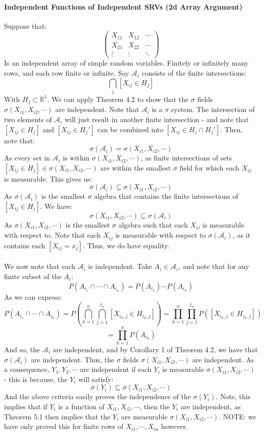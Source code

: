 \documentclass[12pt,a4paper]{article}
\newcommand{\1}[1]{\mathbbm{1}\left\{ #1 \right\}}
\newcommand{\R}{\mathbb{R}}
\newcommand{\acal}{\mathcal{A}}
\begin{document}
\paragraph{Independent Functions of Independent SRVs (2d Array Argument)} Suppose that:
$$
	\begin{pmatrix}
	X_{11} & X_{12} & \cdots\\
	X_{21} & X_{22} & \cdots\\
	\vdots & \vdots & \ddots
	\end{pmatrix}
$$
Is an independent array of simple random variables. Finitely or infinitely many rows, and each row finite or infinite. Say $\acal_i$ consists of the finite intersections:
$$
	\bigcap_j [X_{ij} \in H_j]
$$
With $H_j \subset \R^1$. We can apply Theorem 4.2 to show that the $\sigma$ fields $\sigma(X_{i1}, X_{i2}, \cdots)$ are independent. Note that $\acal_i$ is a $\pi$ system. The intersection of two elements of $\acal_i$ will just result in another finite intersection - and note that $[X_{ij} \in H_j]$ and $[X_{ij} \in H_j']$ can be combined into $[X_{ij} \in H_j \cap H_j']$. Then, note that:
$$
	\sigma(\acal_i) = \sigma(X_{i1}, X_{i2}, \cdots)
$$
As every set in $\acal_i$ is within $\sigma(X_{i1}, X_{i2}, \cdots)$, as finite intersections of sets $[X_{ij} \in H_j] \in \sigma(X_{i1}, X_{i2}, \cdots)$ are within the smallest $\sigma$ field for which each $X_{ij}$ is measurable. This gives us:
$$
	\sigma(\acal_i) \subseteq \sigma(X_{i1}, X_{i2}, \cdots)
$$
As $\sigma(\acal_i)$ is the smallest $\sigma$ algebra that contains the finite intersections of $[X_{ij} \in H_j]$. We have:
$$
	\sigma(X_{i1}, X_{i2}, \cdots) \subseteq \sigma(\acal_i)
$$
As $\sigma(X_{i1}, X_{i2}, \cdots)$ is the smallest $\sigma$ algebra such that each $X_{ij}$ is measurable with respect to. Note that each $X_{ij}$ is measurable with respect to $\sigma(\acal_i)$, as it contains each $[X_{ij} = x_j]$. Thus, we do have equality.
\\\\
We now note that each $\acal_i$ is independent. Take $A_i \in \acal_i$, and note that for any finite subset of the $A_i$:
$$
	P(A_{i_1} \cap \cdots \cap A_{i_n}) = P(A_{i_1}) \cdots P(A_{i_n})
$$
As we can express:
$$
	P(A_{i_1} \cap \cdots \cap A_{i_n}) =
	P\left(\bigcap_{k=1}^n \bigcap_{j=1}^{j_n} [X_{i_k,j} \in H_{i_k,j}]\right) =
	\prod_{k=1}^n \prod_{j=1}^{j_n} P\left([X_{i_k,j} \in H_{i_k,j}]\right)
$$
$$
	= \prod_{k=1}^n P(A_{i_k})
$$
And so, the $\acal_i$ are independent, and by Corollary 1 of Theorem 4.2, we have that $\sigma(\acal_i)$ are independent. Thus, the $\sigma$ fields $\sigma(X_{i1}, X_{i2}, \cdots)$ are independent. As a consequence, $Y_1, Y_2, \cdots$ are independent if each $Y_i$ is measurable $\sigma(X_{i1}, X_{i2}, \cdots)$ - this is because, the $Y_i$ will satisfy:
$$
	\sigma(Y_i) \subseteq \sigma(X_{i1}, X_{i2}, \cdots)
$$
And the above criteria easily proves the independence of the $\sigma(Y_i)$. Note, this implies that if $Y_i$ is a function of $X_{i1}, X_{i2}, \cdots$, then the $Y_i$ are independent, as Theorem 5.1 then implies that the $Y_i$ are measurable $\sigma(X_{i1}, X_{i2}, \cdots)$. NOTE: we have only proved this for finite rows of $X_{i1}, \cdots, X_{in}$ however.
\end{document}
